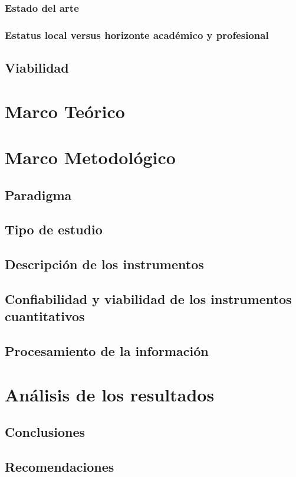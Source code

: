\documentclass[12pt,letterpaper,article,x11names]{memoir}
\begin{document}
\subsection{Estado del arte}
\label{sec:org817808d}
\subsection{Estatus local versus horizonte académico y profesional}
\label{sec:org1981f92}
\section{Viabilidad}
\label{sec:org92c97a0}
\chapter{Marco Teórico}
\label{sec:org7f50a1d}
\chapter{Marco Metodológico}
\label{sec:org0006f1d}
\section{Paradigma}
\label{sec:org4f385ef}
\section{Tipo de estudio}
\label{sec:org8b8e037}
\section{Descripción de los instrumentos}
\label{sec:org37b3f36}
\section{Confiabilidad y viabilidad de los instrumentos cuantitativos}
\label{sec:orgbd36f25}
\section{Procesamiento de la información}
\label{sec:org45c2bc7}
\chapter{Análisis de los resultados}
\label{sec:orgd42ee37}
\section{Conclusiones}
\label{sec:orgc182af6}
\section{Recomendaciones}
\label{sec:org2d7c409}

\printbibliography
\end{document}
